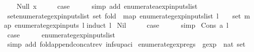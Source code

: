 \begin{isabellebody}
\ \ \isamarkupfalse%
\ {\isacharparenleft}Null\ x{\isacharparenright}\isanewline
\ \ \isamarkupfalse%
\ \isamarkupfalse%
\ {\isacharquery}case\isanewline
\ \ \ \ \isamarkupfalse%
\ {\isacharparenleft}simp\ add{\isacharcolon}\ enumerate{\isacharunderscore}aexp{\isacharunderscore}inputs{\isacharunderscore}list{\isacharparenright}\isanewline
{}\isamarkupfalse%
%
\endisatagproof
{\isafoldproof}%
%
\isadelimproof
\isanewline
%
\endisadelimproof
\isanewline
{}\isamarkupfalse%
\ set{\isacharunderscore}enumerate{\isacharunderscore}gexp{\isacharunderscore}inputs{\isacharunderscore}list{\isacharcolon}\ {\isachardoublequoteopen}set\ {\isacharparenleft}fold\ {\isacharparenleft}{\isacharat}{\isacharparenright}\ {\isacharparenleft}map\ enumerate{\isacharunderscore}gexp{\isacharunderscore}inputs{\isacharunderscore}list\ l{\isacharparenright}\ {\isacharbrackleft}{\isacharbrackright}{\isacharparenright}\ {\isacharequal}\ {\isacharparenleft}{\isasymUnion}\ set\ {\isacharparenleft}map\ enumerate{\isacharunderscore}gexp{\isacharunderscore}inputs\ l{\isacharparenright}{\isacharparenright}{\isachardoublequoteclose}\isanewline
%
\isadelimproof
%
\endisadelimproof
%
\isatagproof
{}\isamarkupfalse%
{\isacharparenleft}induct\ l{\isacharparenright}\isanewline
{}\isamarkupfalse%
\ Nil\isanewline
\ \ \isamarkupfalse%
\ \isamarkupfalse%
\ {\isacharquery}case\isanewline
\ \ \ \ \isamarkupfalse%
\ simp\isanewline
{}\isamarkupfalse%
\isanewline
{}\isamarkupfalse%
\ {\isacharparenleft}Cons\ a\ l{\isacharparenright}\isanewline
\ \ \isamarkupfalse%
\ \isamarkupfalse%
\ {\isacharquery}case\isanewline
\ \ \ \ \isamarkupfalse%
\ enumerate{\isacharunderscore}gexp{\isacharunderscore}inputs{\isacharunderscore}list\isanewline
\ \ \ \ \isamarkupfalse%
\ {\isacharparenleft}simp\ add{\isacharcolon}\ fold{\isacharunderscore}append{\isacharunderscore}concat{\isacharunderscore}rev\ inf{\isacharunderscore}sup{\isacharunderscore}aci{\isacharparenleft}{}{\isacharparenright}{\isacharparenright}\isanewline
{}\isamarkupfalse%
%
\endisatagproof
{\isafoldproof}%
%
\isadelimproof
\isanewline
%
\endisadelimproof
\isanewline
{}\isamarkupfalse%
\ enumerate{\isacharunderscore}gexp{\isacharunderscore}regs\ {\isacharcolon}{\isacharcolon}\ {\isachardoublequoteopen}gexp\ {\isasymRightarrow}\ nat\ set{\isachardoublequoteclose}\ \isanewline

\end{isabellebody}
